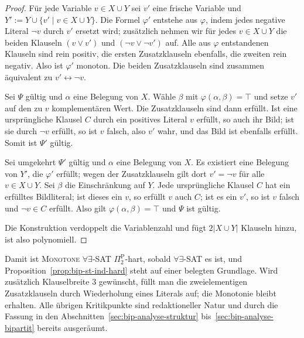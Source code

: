 \begin{proof}
    Für jede Variable \(v\in X\cup Y\) sei \(v'\) eine frische Variable und
    \(Y':=Y\cup\{v'\mid v\in X\cup Y\}\). Die Formel \(\varphi'\) entstehe aus
    \(\varphi\), indem jedes negative Literal \(\neg v\) durch \(v'\) ersetzt
    wird; zusätzlich nehmen wir für jedes \(v\in X\cup Y\) die beiden Klauseln
    \(
        (v\lor v')
    \) und \(
        (\neg v\lor\neg v')
    \)
    auf. Alle aus \(\varphi\) entstandenen Klauseln sind rein positiv, die
    ersten Zusatzklauseln ebenfalls, die zweiten rein negativ. Also ist
    \(\varphi'\) monoton. Die beiden Zusatzklauseln sind zusammen äquivalent zu
    \(v'\leftrightarrow\neg v\).

    Sei \(\Psi\) gültig und \(\alpha\) eine Belegung von \(X\). Wähle \(\beta\)
    mit \(\varphi(\alpha,\beta)=\top\) und setze \(v'\) auf den zu \(v\)
    komplementären Wert. Die Zusatzklauseln sind dann erfüllt. Ist eine
    ursprüngliche Klausel \(C\) durch ein positives Literal \(v\) erfüllt, so
    auch ihr Bild; ist sie durch \(\neg v\) erfüllt, so ist \(v\) falsch, also
    \(v'\) wahr, und das Bild ist ebenfalls erfüllt. Somit ist \(\Psi'\) gültig.

    Sei umgekehrt \(\Psi'\) gültig und \(\alpha\) eine Belegung von \(X\). Es
    existiert eine Belegung von \(Y'\), die \(\varphi'\) erfüllt; wegen der
    Zusatzklauseln gilt dort \(v'=\neg v\) für alle \(v\in X\cup Y\). Sei
    \(\beta\) die Einschränkung auf \(Y\). Jede ursprüngliche Klausel \(C\) hat
    ein erfülltes Bildliteral; ist dieses ein \(v\), so erfüllt \(v\) auch
    \(C\); ist es ein \(v'\), so ist \(v\) falsch und \(\neg v\in C\) erfüllt.
    Also gilt \(\varphi(\alpha,\beta)=\top\) und \(\Psi\) ist gültig.

    Die Konstruktion verdoppelt die Variablenzahl und fügt \(2|X\cup Y|\)
    Klauseln hinzu, ist also polynomiell.
\end{proof}

Damit ist \textsc{Monotone \(\forall\exists\)-SAT} \(\Pi_2^\text{P}\)-hart,
sobald \(\forall\exists\)-SAT es ist, und
Proposition~\ref{prop:bip-st-ind-hard} steht auf einer belegten Grundlage. Wird
zusätzlich Klauselbreite \(3\) gewünscht, füllt man die zweielementigen
Zusatzklauseln durch Wiederholung eines Literals auf; die Monotonie bleibt
erhalten. Alle übrigen Kritikpunkte sind redaktioneller Natur und durch die
Fassung in den Abschnitten~\ref{sec:bip-analyse-struktur}
bis~\ref{sec:bip-analyse-bipartit} bereits ausgeräumt.

